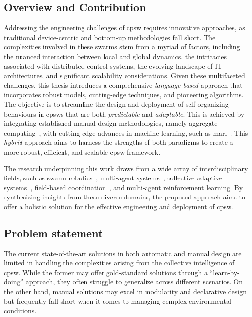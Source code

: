 \begin{refsection}
\section{Overview and Contribution}
Addressing the engineering challenges of \ac{cpsw} requires innovative approaches, 
 as traditional device-centric and bottom-up methodologies fall short. 
The complexities involved in these swarms stem from a myriad of factors, 
 including the nuanced interaction between local and global dynamics, 
 the intricacies associated with distributed control systems, 
 the evolving landscape of IT architectures, and significant scalability considerations.
%
Given these multifaceted challenges, 
 this thesis introduces a comprehensive \emph{language-based} approach that incorporates robust models, 
 cutting-edge techniques, and pioneering algorithms. 
 The objective is to streamline the design and deployment of self-organizing behaviours in \acp{cpsw} that are both \emph{predictable} and \emph{adaptable}. 
This is achieved by integrating established manual design methodologies, namely aggregate computing~\cite{aggregatecomputing}, 
 with cutting-edge advances in machine learning, such as \ac{marl}~\cite{busoniu2008comprehensive}. 
%
This \emph{hybrid} approach aims to harness the strengths of both paradigms to create a more robust, efficient, and scalable \ac{cpsw} framework.

The research underpinning this work draws from a wide array of interdisciplinary fields, 
 such as swarm robotics~\cite{brambilla2013swarm}, multi-agent systems~\cite{dorri2018multi}, collective adaptive systems~\cite{ferscha2015collective}, field-based coordination~\cite{mamei2006field}, and multi-agent reinforcement learning. 
By synthesizing insights from these diverse domains, 
 the proposed approach aims to offer a holistic solution for the effective engineering and deployment of \acf{cpsw}.
\subsection*{Problem statement}
The current state-of-the-art solutions in both automatic and manual design are limited in handling the complexities arising from the collective intelligence of \ac{cpsw}. 
 While the former may offer gold-standard solutions through a ``learn-by-doing'' approach, 
 they often struggle to generalize across different scenarios. 
 On the other hand, manual solutions may excel in modularity and declarative design but frequently fall short when it comes to managing complex environmental conditions.

\end{refsection}
